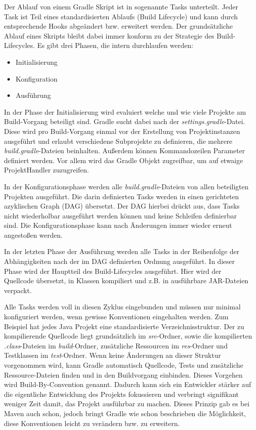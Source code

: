 Der Ablauf von einem Gradle Skript ist in sogenannte Tasks unterteilt. 
Jeder Task ist Teil eines standardisierten Ablaufs (Build Lifecycle) und kann durch entsprechende Hooks abgeändert bzw. erweitert werden.
Der grundsätzliche Ablauf eines Skripts bleibt dabei immer konform zu der Strategie des Build-Lifecycles.
Es gibt drei Phasen, die intern durchlaufen werden:


\begin{itemize} [noitemsep]
	\item Initialisierung
	\item Konfiguration
	\item Ausführung
\end{itemize}


In der Phase der Initialisierung wird evaluiert welche und wie viele Projekte am Build-Vorgang beteiligt sind.
Gradle sucht dabei nach der \textit{settings.gradle}-Datei. 
Diese wird pro Build-Vorgang einmal vor der Erstellung von Projektinstanzen ausgeführt und erlaubt verschiedene Subprojekte zu definieren, die mehrere \textit{build.gradle}-Dateien beinhalten. 
Außerdem können Kommandozeilen Parameter definiert werden. 
Vor allem wird das Gradle Objekt zugreifbar, um auf etwaige ProjektHandler zuzugreifen.

In der Konfigurationsphase werden alle \textit{build.gradle}-Dateien von allen beteiligten Projekten ausgeführt.
Die darin definierten Tasks werden in einen gerichteten azyklischen Graph (DAG) übersetzt.
Der DAG hierbei drückt aus, dass Tasks nicht wiederholbar ausgeführt werden können und keine Schleifen definierbar sind.
Die Konfigurationsphase kann nach Änderungen immer wieder erneut angestoßen werden.

In der letzten Phase der Ausführung werden alle Tasks in der Reihenfolge der Abhängigkeiten nach der im DAG definierten Ordnung ausgeführt.
In dieser Phase wird der Hauptteil des Build-Lifecycles ausgeführt. 
Hier wird der Quellcode übersetzt, in Klassen kompiliert und z.B. in ausführbare JAR-Dateien verpackt.

Alle Tasks werden voll in diesen Zyklus eingebunden und müssen nur minimal konfiguriert werden, wenn gewisse Konventionen eingehalten werden.
Zum Beispiel hat jedes Java Projekt eine standardisierte Verzeichnisstruktur. 
Der zu kompilierende Quellcode liegt grundsätzlich im \textit{src}-Ordner, sowie die kompilierten \textit{.class}-Dateien im \textit{build}-Ordner, zusätzliche Ressourcen im \textit{res}-Ordner und Testklassen im \textit{test}-Ordner.
Wenn keine Änderungen an dieser Struktur vorgenommen wird, kann Gradle automatisch Quellcode, Tests und zusätzliche Ressource-Dateien finden und in den Buildvorgang einbinden.
Dieses Vorgehen wird Build-By-Convention genannt. 
Dadurch kann sich ein Entwickler stärker auf die eigentliche Entwicklung des Projekts fokussieren und verbringt signifikant weniger Zeit damit, das Projekt ausführbar zu machen.
Dieses Prinzip gab es bei Maven auch schon, jedoch bringt Gradle wie schon beschrieben die Möglichkeit, diese Konventionen leicht zu verändern bzw. zu erweitern.

